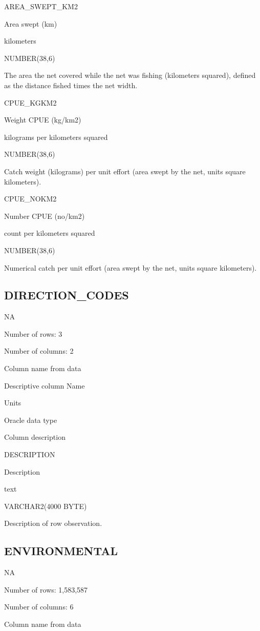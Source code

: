 \documentclass[
  letterpaper,
  oneside,
  open=any]{scrbook}
\begin{document}
AREA\_SWEPT\_KM2

Area swept (km)

kilometers

NUMBER(38,6)

The area the net covered while the net was fishing (kilometers squared),
defined as the distance fished times the net width.

CPUE\_KGKM2

Weight CPUE (kg/km2)

kilograms per kilometers squared

NUMBER(38,6)

Catch weight (kilograms) per unit effort (area swept by the net, units
square kilometers).

CPUE\_NOKM2

Number CPUE (no/km2)

count per kilometers squared

NUMBER(38,6)

Numerical catch per unit effort (area swept by the net, units square
kilometers).

\subsection{DIRECTION\_CODES}\label{direction_codes}

NA

Number of rows: 3

Number of columns: 2

Column name from data

Descriptive column Name

Units

Oracle data type

Column description

DESCRIPTION

Description

text

VARCHAR2(4000 BYTE)

Description of row observation.

\subsection{ENVIRONMENTAL}\label{environmental}

NA

Number of rows: 1,583,587

Number of columns: 6

Column name from data
\end{document}
